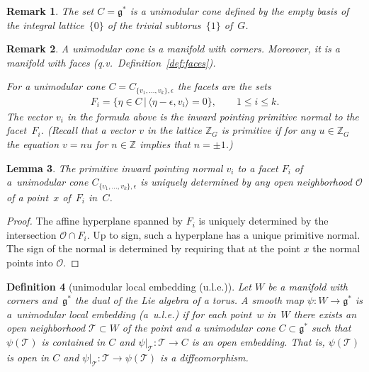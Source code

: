 \documentclass[pdftex]{sigma}
\numberwithin{equation}{section}
\newtheorem{Lemma}{Lemma}[section]
\newtheorem{Definition}[Lemma]{Definition}
\newtheorem{Remark}[Lemma]{Remark}
\begin{document}
\begin{Remark}
The set $C={\mathfrak g}^*$ is a unimodular cone def\/ined by the empty basis
of the integral lattice~$\{ 0 \}$ of the trivial subtorus~$\{1\}$ of~$G$.
\end{Remark}


\begin{Remark}
A unimodular cone is a manifold with corners.
Moreover, it is a manifold with faces (q.v.\ Def\/inition~\ref{def:faces}).

For a unimodular cone $C= C_{\{v_1,\ldots,v_k\}, \epsilon}$ the
facets are the sets
\begin{gather*}
F_i= \{ \eta \in C\,|\, \langle \eta -\epsilon , v_i\rangle =0\},
        \qquad 1\leq i\leq k.
\end{gather*}
The vector $v_i$ in the formula above is the inward
pointing primitive normal to the facet~$F_i$. (Recall that a
vector $v$ in the lattice ${\mathbb Z}_G$ is {\em primitive}
if for any $u\in {\mathbb Z}_G$ the equation $v=nu$ for $n\in {\mathbb Z}$
implies that $n= \pm 1$.)
\end{Remark}

\begin{Lemma}\label{lem:prim-norm}
  The primitive inward pointing normal $v_i$ to a facet $F_i$ of a~unimodular cone $C_{\{v_1,\ldots,v_k\}, \epsilon}$ is uniquely
  determined by any open neighborhood ${\mathcal O}$ of a point~$x$ of~$F_i$
  in~$C$.
\end{Lemma}

\begin{proof}
The af\/f\/ine hyperplane spanned by $F_i$ is uniquely
determined by the intersection \mbox{${\mathcal O}\cap F_i$}.  Up to sign, such a
hyperplane has a unique primitive normal.  The sign of the normal is
determined by requiring that at the point $x$ the normal points into
${\mathcal O}$.
\end{proof}

\begin{Definition}[unimodular local embedding (u.l.e.)]
\label{def:unimodular emb}
  Let $W$ be a manifold with corners and~${\mathfrak g}^*$ the dual of
  the Lie algebra of a torus.  A smooth map $\psi \colon W \to {\mathfrak g}^*$
  is a~\emph{unimodular local embedding} (a~{\em u.l.e.}) if for each
  point~$w$ in~$W$ there exists an open neighborhood ${\mathcal T} \subset W$ of
  the point and a unimodular cone $C \subset {\mathfrak g}^*$ such that
  $\psi({\mathcal T})$ is contained in $C$ and $\psi|_{{\mathcal T}} \colon {\mathcal T}
  \to C$ is an {\em open embedding}. That is, $\psi({\mathcal T})$ is open in $C$
  and $\psi|_{{\mathcal T}}\colon  {\mathcal T}\to \psi({\mathcal T})$ is a dif\/feomorphism.
\end{Definition}
\end{document}
